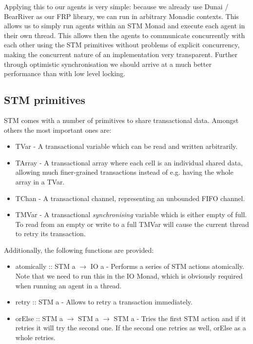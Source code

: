 Applying this to our agents is very simple: because we already use Dunai / BearRiver as our FRP library, we can run in arbitrary Monadic contexts. This allows us to simply run agents within an STM Monad and execute each agent in their own thread. This allows then the agents to communicate concurrently with each other using the STM primitives without problems of explicit concurrency, making the concurrent nature of an implementation very transparent. Further through optimistic synchronisation we should arrive at a much better performance than with low level locking.

\subsection{STM primitives}
STM comes with a number of primitives to share transactional data. Amongst others the most important ones are:

\begin{itemize}
	\item TVar - A transactional variable which can be read and written arbitrarily. 
	\item TArray - A transactional array where each cell is an individual shared data, allowing much finer-grained transactions instead of e.g. having the whole array in a TVar.
	\item TChan - A transactional channel, representing an unbounded FIFO channel.
	\item TMVar - A transactional \textit{synchronising} variable which is either empty of full. To read from an empty or write to a full TMVar will cause the current thread to retry its transaction.
\end{itemize}

Additionally, the following functions are provided:

\begin{itemize}
	\item atomically :: STM a $\to$ IO a - Performs a series of STM actions atomically. Note that we need to run this in the IO Monad, which is obviously required when running an agent in a thread.
	\item retry :: STM a - Allows to retry a transaction immediately.
	\item orElse :: STM a $\to$ STM a $\to$ STM a - Tries the first STM action and if it retries it will try the second one. If the second one retries as well, orElse as a whole retries.
\end{itemize}

